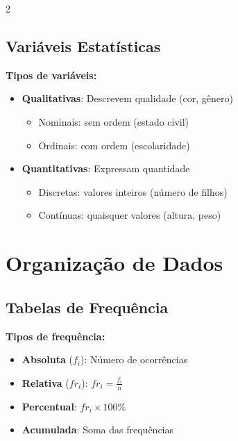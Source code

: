 \documentclass[11pt]{article}
\begin{document}
\begin{multicols}{2}
\subsection*{Variáveis Estatísticas}


\textbf{Tipos de variáveis:}
\begin{itemize}
\item \textbf{Qualitativas}: Descrevem qualidade (cor, gênero)
  \begin{itemize}
  \item Nominais: sem ordem (estado civil)
  \item Ordinais: com ordem (escolaridade)
  \end{itemize}
\item \textbf{Quantitativas}: Expressam quantidade
  \begin{itemize}
  \item Discretas: valores inteiros (número de filhos)
  \item Contínuas: quaisquer valores (altura, peso)
  \end{itemize}
\end{itemize}

\section*{Organização de Dados}

\subsection*{Tabelas de Frequência}


\textbf{Tipos de frequência:}
\begin{itemize}
\item \textbf{Absoluta} ($f_i$): Número de ocorrências
\item \textbf{Relativa} ($fr_i$): $fr_i = \frac{f_i}{n}$
\item \textbf{Percentual}: $fr_i \times 100\%$
\item \textbf{Acumulada}: Soma das frequências
\end{itemize}


\end{multicols}
\end{document}
